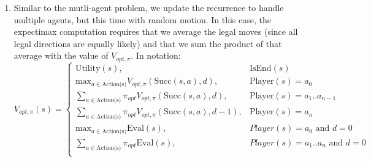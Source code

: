 \documentclass[12pt]{article}
\begin{document}
\begin{enumerate}[label=(\alph*)]
	\item Similar to the mutli-agent problem, we update the recurrence to
		handle multiple agents, but this time with random motion. In this
		case, the expectimax computation requires that we average the legal
		moves (since all legal directions are equally likely) and that
		we sum the product of that average with the value of \(V_{opt, \pi}\).
		In notation:
		\[
			V_{opt, \pi}(s) = 
			\begin{cases}
				\text{Utility}(s), & \text{IsEnd}(s)\\
				\text{max}_{a \in \text{Action(s)}} V_{opt, \pi}(\text{Succ}(s,a), d), &
					\text{Player}(s) = a_0\\
				\sum_{a \in \text{Action(s)}} \pi_{opt} V_{opt, \pi}(\text{Succ}(s,a), d), &
					\text{Player}(s) = a_1..a_{n-1}\\
				\sum_{a \in \text{Action(s)}} \pi_{opt} V_{opt, \pi}(\text{Succ}(s,a), d - 1), &
					\text{Player}(s) = a_n\\
				\text{max}_{a \in \text{Action(s)}} \text{Eval}(s), &
					Player(s) = a_0 \text{ and } d = 0\\
				\sum_{a \in \text{Action(s)}} \pi_{opt} \text{Eval}(s), &
					Player(s) = a_1..a_n \text{ and } d = 0\\
			\end{cases}
		\]
\end{enumerate}
\end{document}
